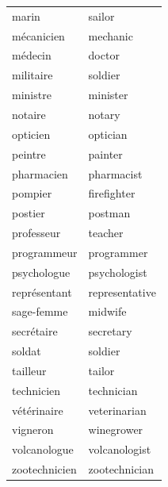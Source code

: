 \documentclass[12pt,a4paper]{article}
\begin{document}
\begin{longtable}{p{4cm} p{6cm}}
marin & sailor \\
mécanicien & mechanic \\
médecin & doctor \\
militaire & soldier \\
ministre & minister \\
notaire & notary \\
opticien & optician \\
peintre & painter \\
pharmacien & pharmacist \\
pompier & firefighter \\
postier & postman \\
professeur & teacher \\
programmeur & programmer \\
psychologue & psychologist \\
représentant & representative \\
sage-femme & midwife \\
secrétaire & secretary \\
soldat & soldier \\
tailleur & tailor \\
technicien & technician \\
vétérinaire & veterinarian \\
vigneron & winegrower \\
volcanologue & volcanologist \\
zootechnicien & zootechnician \\
\bottomrule
\end{longtable}

\newpage
\end{document}
